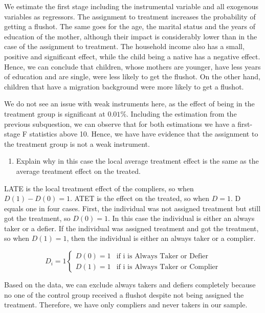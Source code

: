 \documentclass[
]{article}
\providecommand{\tightlist}{%
  \setlength{\itemsep}{0pt}\setlength{\parskip}{0pt}}
\begin{document}
We estimate the first stage including the instrumental variable and all
exogenous variables as regressors. The assignment to treatment increases
the probability of getting a flushot. The same goes for the age, the
marital status and the years of education of the mother, although their
impact is considerably lower than in the case of the assignment to
treatment. The household income also has a small, positive and
significant effect, while the child being a native has a negative
effect. Hence, we can conclude that children, whose mothers are younger,
have less years of education and are single, were less likely to get the
flushot. On the other hand, children that have a migration background
were more likely to get a flushot.

We do not see an issue with weak instruments here, as the effect of
being in the treatment group is significant at \(0.01\%\). Including the
estimation from the previous subquestion, we can observe that for both
estimations we have a first-stage F statistics above 10. Hence, we have
have evidence that the assignment to the treatment group is not a weak
instrument.

\begin{enumerate}
\def\labelenumi{\alph{enumi})}
\setcounter{enumi}{6}
\tightlist
\item
  Explain why in this case the local average treatment effect is the
  same as the average treatment effect on the treated.
\end{enumerate}

LATE is the local treatment effect of the compliers, so when
\(D(1)-D(0)=1\). ATET is the effect on the treated, so when \(D=1\). D
equals one in four cases. First, the individual was not assigned
treatment but still got the treatment, so \(D(0) = 1\). In this case the
individual is either an always taker or a defier. If the individual was
assigned treatment and got the treatment, so when \(D(1)=1\), then the
individual is either an always taker or a complier.

\[
D_i = 1 
\begin{cases}
  D(0) = 1 & \text{if i is Always Taker or Defier}\\
  D(1) = 1 & \text{if i is Always Taker or Complier}
\end{cases}
\]

Based on the data, we can exclude always takers and defiers completely
because no one of the control group received a flushot despite not being
assigned the treatment. Therefore, we have only compliers and never
takers in our sample.
\end{document}
